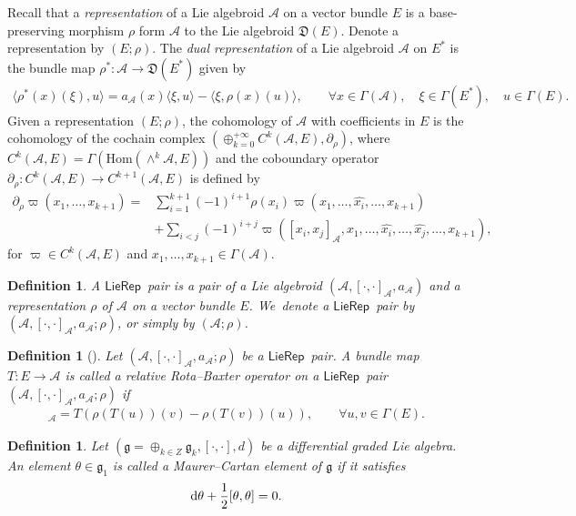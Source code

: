 \documentclass[10pt,a4paper]{amsart}
\numberwithin{equation}{section}
\newtheorem{defi}[thm]{Definition}
\newcommand{\huaA}{\mathcal{A}}
\newcommand{\frkD}{\mathfrak D}
\newcommand{\frkg}{\mathfrak g}
\newcommand{\Hom}{\mathrm{Hom}}
\newcommand{\LP}{$\mathsf{LieRep}$~}
\begin{document}
Recall that a {\it representation} of a Lie algebroid $\huaA$
 on a vector bundle $E$ is a base-preserving morphism $\rho$ form $\huaA$ to the Lie algebroid $\frkD(E)$.
Denote a representation by $(E;\rho).$
The {\it dual representation} of a Lie algebroid $\huaA$ on $E^*$ is the bundle map $\rho^*\colon \huaA\longrightarrow \frkD(E^*)$ given by
\begin{gather*}
\langle \rho^*(x)(\xi),u\rangle=a_\huaA(x)\langle \xi,u\rangle-\langle \xi,\rho(x)(u)\rangle,\qquad \forall x\in \Gamma(\huaA),\quad\xi\in\Gamma(E^*),\quad u\in\Gamma(E).
\end{gather*}
Given a representation $(E;\rho)$, the cohomology of $\huaA$ with coefficients in $E$ is the cohomology of the cochain complex
$(\oplus_{k=0}^{+\infty}C^k(\huaA,E),\partial_\rho )$, where $C^k(\huaA,E)=\Gamma(\Hom(\wedge^k \huaA, E))$ and the coboundary operator $\partial_\rho\colon C^k(\huaA,E)\to C^{k+1}(\huaA,E)$
is defined by
\begin{align*}
 \partial_\rho\varpi(x_1,\dots,x_{k+1}){}=&\sum_{i=1}^{k+1}(-1)^{i+1} \rho(x_i)\varpi(x_1,\dots,\hat{x_i},\dots,x_{k+1})
 \\
 &+\sum_{i<j}(-1)^{i+j}\varpi([x_i,x_j]_\huaA,x_1,\dots,\hat{x_i},\dots,\hat{x_j},\dots,x_{k+1}),
\end{align*}
for $\varpi\in C^k(\huaA,E) $ and $x_1,\dots,x_{k+1}\in \Gamma(\huaA)$.

\begin{defi}
A {\it \LP pair} is a pair of a Lie algebroid $(\huaA,[\cdot,\cdot]_\huaA,a_\huaA)$ and a representation $\rho$ of $\huaA$ on a vector bundle $E$. We~denote a \LP pair by $(\huaA,[\cdot,\cdot]_\huaA,a_\huaA;\rho)$, or simply by $(\huaA;\rho)$.
\end{defi}


\begin{defi}[\cite{LiuShengBaiChen}]
Let $(\huaA,[\cdot,\cdot]_\huaA,a_\huaA;\rho)$ be a \LP pair. A bundle map
 $T\colon E\longrightarrow \huaA$ is called a {\it relative Rota--Baxter operator} on a \LP pair $(\huaA,[\cdot,\cdot]_\huaA,a_\huaA;\rho)$ if
 \begin{gather*}
 [T(u),T(v)]_{\huaA}=T(\rho(T(u))(v)-\rho(T(v))(u)), \qquad\forall u,v\in\Gamma{(E)}.
\end{gather*}
\end{defi}

\begin{defi}
Let $(\frkg=\oplus_{k\in Z} \frkg_{k},[\cdot,\cdot],d)$ be a differential graded Lie algebra. An element $\theta\in \frkg_{1}$ is called a {\it Maurer--Cartan element} of $\frkg$ if it satisfies
\begin{gather*}
{\rm d}\theta+\frac {1}{2}[\theta,\theta]=0.
\end{gather*}
\end{defi}
\end{document}
